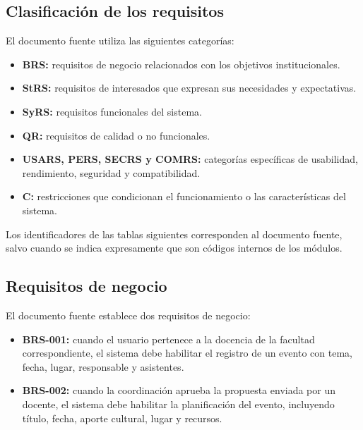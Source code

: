 \subsection{Clasificación de los requisitos}
El documento fuente utiliza las siguientes categorías:
\begin{itemize}
\item \textbf{BRS:} requisitos de negocio relacionados con los objetivos institucionales.
\item \textbf{StRS:} requisitos de interesados que expresan sus necesidades y expectativas.
\item \textbf{SyRS:} requisitos funcionales del sistema.
\item \textbf{QR:} requisitos de calidad o no funcionales.
\item \textbf{USARS, PERS, SECRS y COMRS:} categorías específicas de usabilidad, rendimiento, seguridad y compatibilidad.
\item \textbf{C:} restricciones que condicionan el funcionamiento o las características del sistema.
\end{itemize}
Los identificadores de las tablas siguientes corresponden al documento fuente, salvo cuando se indica expresamente que son códigos internos de los módulos.

\subsection{Requisitos de negocio}
El documento fuente establece dos requisitos de negocio:
\begin{itemize}
\item \textbf{BRS-001:} cuando el usuario pertenece a la docencia de la facultad correspondiente, el sistema debe habilitar el registro de un evento con tema, fecha, lugar, responsable y asistentes.
\item \textbf{BRS-002:} cuando la coordinación aprueba la propuesta enviada por un docente, el sistema debe habilitar la planificación del evento, incluyendo título, fecha, aporte cultural, lugar y recursos.
\end{itemize}

